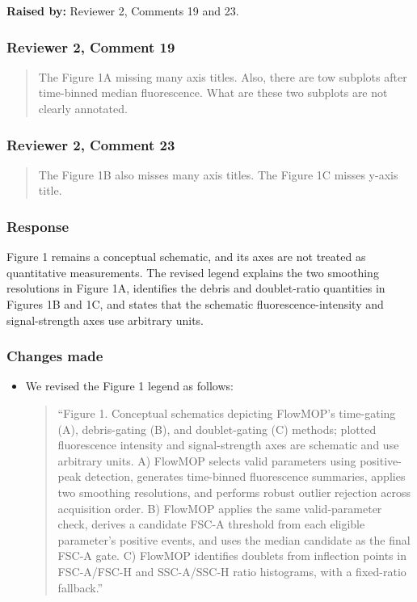 \documentclass[
  11pt,
  a4paper,
]{article}
\begin{document}
\textbf{Raised by:} Reviewer 2, Comments 19 and 23.

\subsubsection{Reviewer 2, Comment 19}\label{reviewer-2-comment-19}

\begin{quote}
The Figure 1A missing many axis titles. Also, there are tow subplots
after time-binned median fluorescence. What are these two subplots are
not clearly annotated.
\end{quote}

\subsubsection{Reviewer 2, Comment 23}\label{reviewer-2-comment-23}

\begin{quote}
The Figure 1B also misses many axis titles. The Figure 1C misses y-axis
title.
\end{quote}

\subsubsection{Response}\label{response-14}

Figure 1 remains a conceptual schematic, and its axes are not treated as
quantitative measurements. The revised legend explains the two smoothing
resolutions in Figure 1A, identifies the debris and doublet-ratio
quantities in Figures 1B and 1C, and states that the schematic
fluorescence-intensity and signal-strength axes use arbitrary units.

\subsubsection{Changes made}\label{changes-made-14}

\begin{itemize}
\item
  We revised the Figure 1 legend as follows:

  \begin{quote}
  ``Figure 1. Conceptual schematics depicting FlowMOP's time-gating (A),
  debris-gating (B), and doublet-gating (C) methods; plotted
  fluorescence intensity and signal-strength axes are schematic and use
  arbitrary units. A) FlowMOP selects valid parameters using
  positive-peak detection, generates time-binned fluorescence summaries,
  applies two smoothing resolutions, and performs robust outlier
  rejection across acquisition order. B) FlowMOP applies the same
  valid-parameter check, derives a candidate FSC-A threshold from each
  eligible parameter's positive events, and uses the median candidate as
  the final FSC-A gate. C) FlowMOP identifies doublets from inflection
  points in FSC-A/FSC-H and SSC-A/SSC-H ratio histograms, with a
  fixed-ratio fallback.''
  \end{quote}
\end{itemize}
\end{document}

